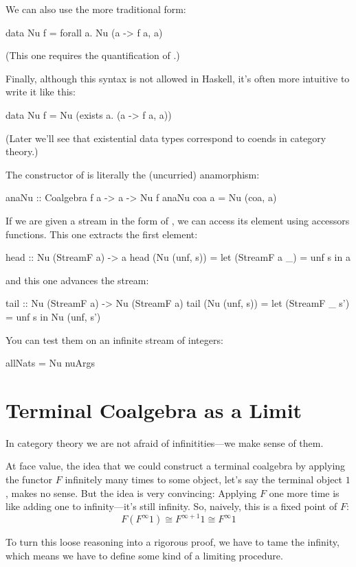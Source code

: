 \documentclass[DaoFP]{subfiles}
\begin{document}
We can also use the more traditional form:
\begin{haskell}
data Nu f = forall a. Nu (a -> f a, a)
\end{haskell}
(This one requires the quantification of .)

Finally, although this syntax is not allowed in Haskell, it's often more intuitive to write it like this:
\begin{haskell}
data Nu f = Nu (exists a. (a -> f a, a))
\end{haskell}
(Later we'll see that existential data types correspond to coends in category theory.)

The constructor of  is literally the (uncurried) anamorphism:
\begin{haskell}
anaNu :: Coalgebra f a -> a -> Nu f
anaNu coa a = Nu (coa, a)
\end{haskell}

If we are given a stream in the form of , we can access its element using accessors functions. This one extracts the first element:
\begin{haskell}
head :: Nu (StreamF a) -> a
head (Nu (unf, s)) = 
  let (StreamF a _) = unf s 
  in a
\end{haskell}
and this one advances the stream:
\begin{haskell}
tail :: Nu (StreamF a) -> Nu (StreamF a)
tail (Nu (unf, s)) = 
  let (StreamF _ s') = unf s 
  in Nu (unf, s')
\end{haskell}
You can test them on an infinite stream of integers:
\begin{haskell}
allNats = Nu nuArgs
\end{haskell}

\section{Terminal Coalgebra as a Limit}

In category theory we are not afraid of infinitities---we make sense of them. 

At face value, the idea that we could construct a terminal coalgebra by applying the functor $F$ infinitely many times to some object, let's say the terminal object $1$, makes no sense. But the idea is very convincing: Applying $F$ one more time is like adding one to infinity---it's still infinity. So, naively, this is a fixed point of $F$:
\[ F (F^{\infty} 1) \cong F^{\infty + 1} 1 \cong F^{\infty} 1\]

To turn this loose reasoning into a rigorous proof, we have to tame the infinity, which means we have to define some kind of a limiting procedure. 
\end{document}
